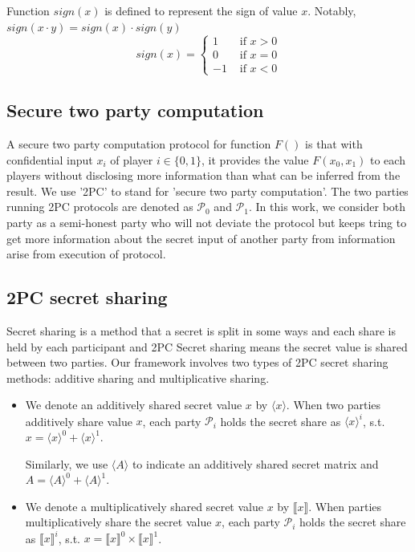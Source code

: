 \documentclass[letterpaper]{article} %
\begin{document}
    Function $sign(x)$ is defined to represent the sign of value $x$.
    Notably,
    $sign(x\cdot y)=sign(x)\cdot sign(y)$
    $$sign(x)=\begin{cases}
        1 & \text{ if } x>0 \\
        0 & \text{ if } x=0\\
        -1 & \text{ if } x<0
    \end{cases}$$

    \subsection{Secure two party computation}

    A secure two party computation protocol for function $F()$ is that
    with confidential input $x_{i}$ of player $i \in \{0,1\} $,
    it provides the value $F(x_{0},x_{1})$ to each players
    without disclosing more information than what can be inferred from the result.
    We use '2PC' to stand for 'secure two party computation'.
    The two parties running 2PC protocols are denoted as $\mathcal{P}_{0} $ and $\mathcal{P}_{1}$.
    In this work, we consider both party as a semi-honest party
    who will not deviate the protocol but keeps tring to get more information about
    the secret input of another party from information arise from execution of protocol.


    \subsection{2PC secret sharing}
    Secret sharing is a method that a secret is split in some ways and each share is held by each participant
    and 2PC Secret sharing means the secret value is shared between two parties.
    Our framework involves two types of 2PC secret sharing methods:
    additive sharing and multiplicative sharing.

    \begin{itemize}
        \item
        We denote an additively shared secret value $x$ by $\langle x\rangle $.
        When two parties additively share value $x$,
        each party $\mathcal{P}_{i}$ holds the secret share as $\langle x\rangle ^{i}$, s.t.
        $x=\langle x\rangle ^{0}+\langle x\rangle ^{1}$.

        Similarly, we use $\langle A\rangle $ to indicate an additively shared secret matrix
        and $A =\langle A\rangle ^{0}+\langle A\rangle ^{1}$.

        \item We denote a multiplicatively shared secret value $x$ by $\llbracket x \rrbracket$.
        When parties multiplicatively share the secret value $x$,
        each party $\mathcal{P}_{i}$ holds the secret share as $\llbracket x \rrbracket ^{i}$, s.t.
        $x=\llbracket x \rrbracket ^{0}\times \llbracket x \rrbracket ^{1}$.

    \end{itemize}
\end{document}
